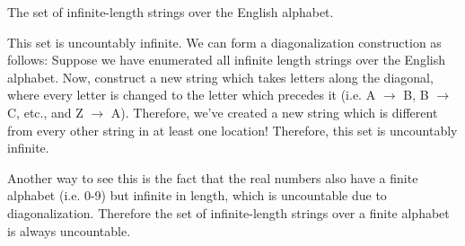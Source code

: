 \documentclass[11pt]{article}
\begin{document}
\begin{Parts}
\Part The set of infinite-length strings over the English alphabet.

\begin{solution}
  This set is uncountably infinite. We can form a diagonalization construction as follows: Suppose we have enumerated all infinite length strings over the English alphabet. Now, construct a new string which takes letters along the diagonal, where every letter is changed to the letter which precedes it (i.e. A $\to$ B, B $\to$ C, etc., and Z $\to$ A). Therefore, we've created a new string which is different from every other string in at least one location! Therefore, this set is uncountably infinite. 

  Another way to see this is the fact that the real numbers also have a finite alphabet (i.e. 0-9) but infinite in length, which is uncountable due to diagonalization. Therefore the set of infinite-length strings over a finite alphabet is always uncountable. 
\end{solution}

\end{Parts}

\pagebreak
{}
\end{document}
